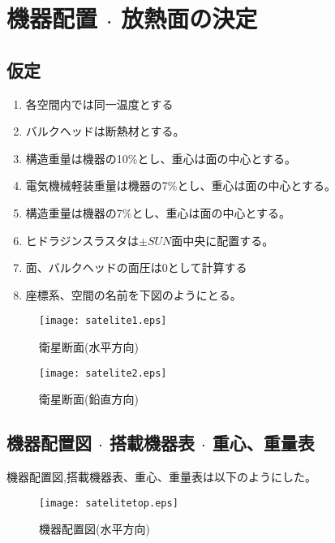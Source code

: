 \section{機器配置 $\cdot$ 放熱面の決定}

\subsection{仮定}
\begin{enumerate}
  \item 各空間内では同一温度とする
  \item バルクヘッドは断熱材とする。
  \item 構造重量は機器の10\%とし、重心は面の中心とする。
  \item 電気機械軽装重量は機器の7\%とし、重心は面の中心とする。
  \item 構造重量は機器の7\%とし、重心は面の中心とする。
  \item ヒドラジンスラスタは$ \pm SUN$面中央に配置する。
  \item 面、バルクヘッドの面圧は0として計算する
  \item 座標系、空間の名前を下図のようにとる。
\end{enumerate}

\begin{figure}[H]
  \caption{衛星断面(水平方向)}
\begin{center}
  \texttt{[image: satelite1.eps]}
\end{center}
\end{figure}

\begin{figure}[H]
  \caption{衛星断面(鉛直方向)}
\begin{center}
  \texttt{[image: satelite2.eps]}
\end{center}
\end{figure}
\newpage

\subsection{機器配置図 $\cdot$ 搭載機器表 $\cdot$ 重心、重量表}
機器配置図,搭載機器表、重心、重量表は以下のようにした。
\begin{figure}[H]
  \caption{機器配置図(水平方向)}
\begin{center}
  \texttt{[image: satelitetop.eps]}
\end{center}
\end{figure} \newpage

